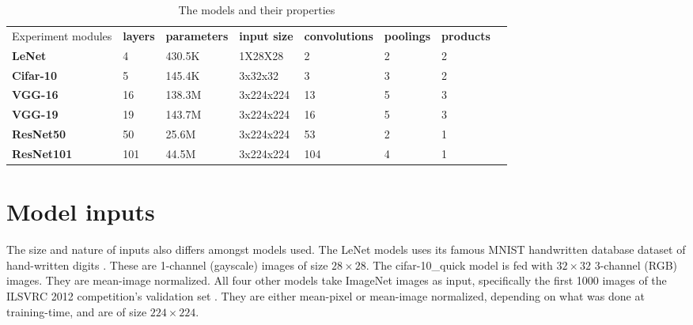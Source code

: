 \begin{table}[]
\centering
\caption[Model properties]{The models and their properties}
\label{tbl:models}
\begin{tabular}{|l|l|l|l|l|l|l|l}
\cline{1-7}
Experiment modules & \textbf{layers} & \textbf{parameters} & \textbf{input size} & \textbf{convolutions} & \textbf{poolings} & \textbf{products} &  \\ \cline{1-7}
\textbf{LeNet}     & 4               & 430.5K              & 1X28X28             & 2                     & 2                 & 2                       &  \\ \cline{1-7}
\textbf{Cifar-10}  & 5               & 145.4K              & 3x32x32             & 3                     & 3                 & 2                       &  \\ \cline{1-7}
\textbf{VGG-16}    & 16              & 138.3M              & 3x224x224           & 13                    & 5                 & 3                       &  \\ \cline{1-7}
\textbf{VGG-19}    & 19              & 143.7M              & 3x224x224           & 16                    & 5                 & 3                       &  \\ \cline{1-7}
\textbf{ResNet50}  & 50              & 25.6M               & 3x224x224           & 53                    & 2                 & 1                       &  \\ \cline{1-7}
\textbf{ResNet101} & 101             & 44.5M               & 3x224x224           & 104                   & 4                 & 1                       &  \\ \cline{1-7}
\end{tabular}
\end{table}

\section{Model inputs}
The size and nature of inputs also differs amongst models used. The LeNet models uses its famous MNIST handwritten database dataset of hand-written digits \cite{mnist}. These are 1-channel (gayscale) images of size $28\times28$. The cifar-10\_quick model is fed with $32\times32$ 3-channel (RGB) images. They are mean-image normalized. All four other models take ImageNet images as input, specifically the first 1000 images of the ILSVRC 2012 competition's validation set \cite{imagenet}. They are either mean-pixel or mean-image normalized, depending on what was done at training-time, and are of size $224\times224$.

